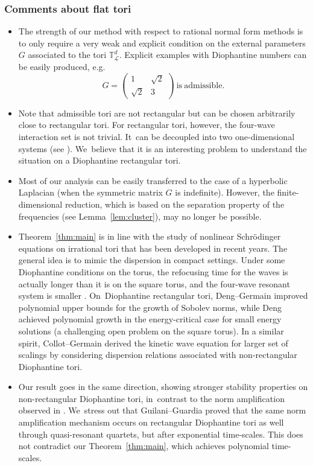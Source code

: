 \documentclass[10pt,a4paper]{amsart}
\providecommand{\eg}{e.g.}
\theoremstyle{plain}
\theoremstyle{definition}
\newcommand{\1}{\mathbf{1}}
\providecommand{\Subsubsection}{\subsubsection}
\providecommand{\Subsubsection}{\subsubsection}
\begin{document}
\Subsubsection{Comments about flat tori}
\begin{itemize}
\item The strength of our method with respect to rational normal form methods is to only require a very weak and explicit condition on the external parameters $G$ associated to the tori $\mathbb{T}^d_{\mathscr{L}}$. Explicit examples with Diophantine numbers can be easily produced, \eg
\begin{equation}
\label{eq:monjoliexemple}
G =
\begin{pmatrix} 1 & \sqrt{2} \\
\sqrt{2} & 3
\end{pmatrix} \ \mathrm{is} \ \mathrm{admissible}.
\end{equation}
\item Note that admissible tori are not rectangular but can be chosen arbitrarily close to rectangular tori. For rectangular tori, however, the four-wave interaction set is not trivial. It~can be decoupled into two one-dimensional systems (see \cite{Staffilani-Wilson-20}). We~believe that it is an interesting problem to understand the situation on a Diophantine rectangular tori.
\item Most of our analysis can be easily transferred to the case of a hyperbolic Laplacian (when the symmetric matrix $G$ is indefinite). However, the finite-dimen\-sional reduction, which is based on the separation property of the frequencies (see Lemma~\ref{lem:cluster}), may no longer be possible.
\item Theorem~\ref{thm:main} is in line with the study of nonlinear Schrödinger equations on irrational tori that has been developed in recent years. The general idea is to mimic the dispersion in compact settings. Under some Diophantine conditions on the torus, the refocusing time for the waves is actually longer \cite{dgg17,dggmr-22} than it is on the square torus, and the four-wave resonant system is smaller \cite{Staffilani-Wilson-20}. On~Diophantine rectangular tori, Deng--Germain \cite{dg19} improved polynomial upper bounds for the growth of Sobolev norms, while Deng \cite{Deng-19} achieved polynomial growth in the energy-critical case for small energy solutions (a challenging open problem on the square torus). In a similar spirit, Collot--Germain \cite{CG20} derived the kinetic wave equation for larger set of scalings by considering dispersion relations associated with non-rectangular Diophantine tori.
\item Our result goes in the same direction, showing stronger stability properties on non-rectangular Diophantine tori, in~contrast to the norm amplification observed in \cite{CKSTT}. We~stress out that Guilani--Guardia \cite{GG22} proved that the same norm amplification mechanism occurs on rectangular Diophantine tori as well through quasi-resonant quartets, but after exponential time-scales. This does not contradict our Theorem~\ref{thm:main}, which achieves polynomial time-scales.
\end{itemize}
\end{document}
